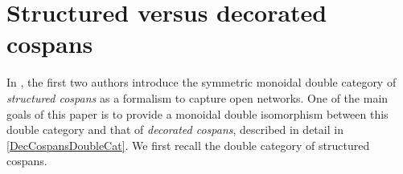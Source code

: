 \documentclass[reqno]{amsart}
\begin{document}






\section{Structured versus decorated cospans} \label{EquivDoubleCats}

In \cite{BC2}, the first two authors introduce the symmetric monoidal double category of \emph{structured cospans} as a formalism to capture open networks. One of the main goals of this paper is to provide a monoidal double isomorphism between this double category and that of \emph{decorated cospans}, described in detail in \cref{DecCospansDoubleCat}. We first recall the double category of structured cospans.
\end{document}
